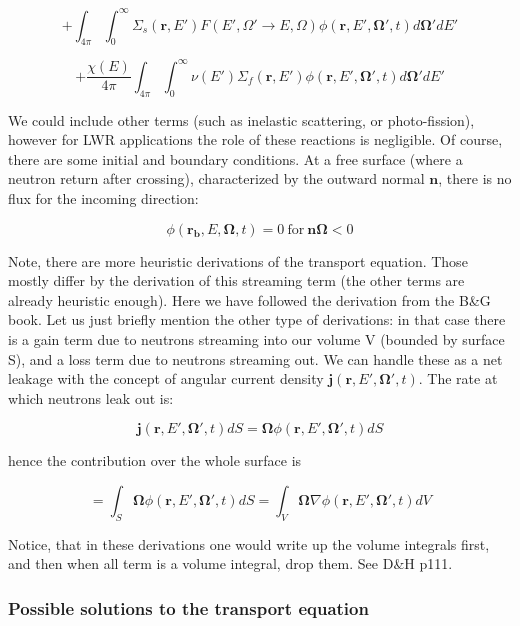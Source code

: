 \begin{equation*}
+\int_{4\pi}\int_{0}^\infty \Sigma_s(\mathbf{r},E')F(E',\Omega' \rightarrow E,\Omega)\phi(\mathbf{r},E',\mathbf{\Omega'},t)d\mathbf{\Omega'}dE'
\end{equation*}

\begin{equation*}
+\frac{\chi(E)}{4\pi}\int_{4\pi}\int_{0}^\infty \nu(E')\Sigma_f(\mathbf{r},E')\phi(\mathbf{r},E',\mathbf{\Omega'},t)d\mathbf{\Omega'}dE'
\end{equation*}

We could include other terms (such as inelastic scattering, or photo-fission), however for LWR applications the role of these reactions is negligible. Of course, there are some initial and boundary conditions. At a free surface (where a neutron return after crossing), characterized by the outward normal $\mathbf{n}$, there is no flux for the incoming direction:

\begin{equation}
\phi(\mathbf{r_b},E,\mathbf{\Omega},t)=0 \: \text{for} \: \mathbf{n\Omega}<0
\end{equation}

Note, there are more heuristic derivations of the transport equation. Those mostly differ by the derivation of this streaming term (the other terms are already heuristic enough). Here we have followed the derivation from the B\&G book. Let us just briefly mention the other type of derivations: in that case there is a gain term due to neutrons streaming into our volume V (bounded by surface S), and a loss term due to neutrons streaming out. We can handle these as a net leakage with the concept of angular current density $\mathbf{j}(\mathbf{r},E',\mathbf{\Omega'},t)$. The rate at which neutrons leak out is:

$$\mathbf{j}(\mathbf{r},E',\mathbf{\Omega'},t)dS=\mathbf{\Omega}\phi(\mathbf{r},E',\mathbf{\Omega'},t)dS$$

\noindent hence the contribution over the whole surface is

$$=\int_S\mathbf{\Omega}\phi(\mathbf{r},E',\mathbf{\Omega'},t)dS=\int_V\mathbf{\Omega}\nabla\phi(\mathbf{r},E',\mathbf{\Omega'},t)dV$$

Notice, that in these derivations one would write up the volume integrals first, and then when all term is a volume integral, drop them. See D\&H p111.

\subsubsection{Possible solutions to the transport equation}

